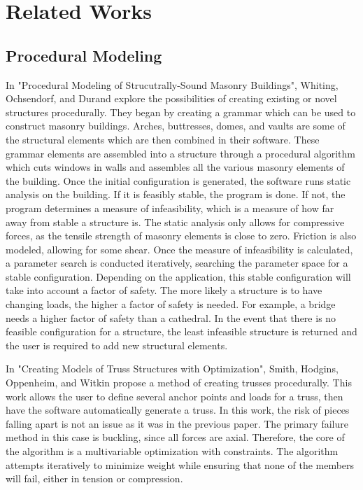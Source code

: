 \documentclass{thesis}
\begin{document}
\section{Related Works}
\subsection{Procedural Modeling}
In "Procedural Modeling of Strucutrally-Sound Masonry Buildings"\cite{whiting:2009}, Whiting, Ochsendorf, and Durand explore
the possibilities of creating existing or novel structures procedurally.  They began by creating a grammar
which can be used to construct masonry buildings.  Arches, buttresses, domes, and vaults are some of the
structural elements which are then combined in their software.  These grammar elements are assembled into
a structure through a procedural algorithm which cuts windows in walls and assembles
all the various masonry elements of the building.  Once the initial configuration is
generated, the software runs static analysis on the building.  If it is feasibly stable, the program is
done.  If not, the program determines a measure of infeasibility, which is a measure of how far away from
stable a structure is.  The static analysis only allows for compressive forces, as the tensile strength of
masonry elements is close to zero.  Friction is also modeled, allowing for some shear.  Once the measure
of infeasibility is calculated, a parameter search is conducted iteratively, searching the parameter space
for a stable configuration.  Depending on the application, this stable configuration will take into account
a factor of safety.  The more likely a structure is to have changing loads, the higher a factor of
safety is needed.  For example, a bridge needs a higher factor of safety than a cathedral.  In the event
that there is no feasible configuration for a structure, the least infeasible structure is returned and the
user is required to add new structural elements.

In "Creating Models of Truss Structures with Optimization"\cite{Carnegie02creatingmodels}, Smith, Hodgins, Oppenheim, and Witkin propose
a method of creating trusses procedurally.  This work allows the user to define several anchor points
and loads for a truss, then have the software automatically generate a truss.  In this work, the risk
of pieces falling apart is not an issue as it was in the previous paper.  The primary failure method
in this case is buckling, since all forces are axial.  Therefore, the core of the algorithm is a
multivariable optimization with constraints.  The algorithm attempts iteratively to minimize weight
while ensuring that none of the members will fail, either in tension or compression.
\end{document}
